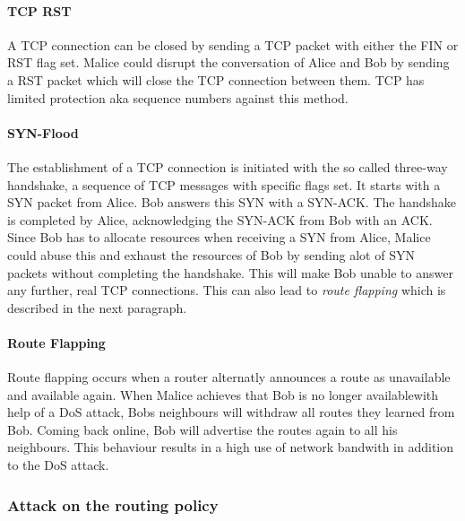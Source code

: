 \documentclass[12pt,a4paper]{IEEEtran}
\begin{document}
		\paragraph{TCP RST}
		A TCP connection can be closed by sending a TCP packet with either the FIN or RST flag set. 
		Malice could disrupt the conversation of Alice and Bob by sending a RST packet which will close the TCP connection between them. TCP has limited protection aka sequence numbers against this method. 

		\paragraph{SYN-Flood}
		The establishment of a TCP connection is initiated with the so called three-way handshake, a sequence of TCP messages with specific flags set. It starts with a SYN packet from Alice. Bob answers this SYN with a SYN-ACK. The handshake is completed by Alice, acknowledging the SYN-ACK from Bob with an ACK.
		Since Bob has to allocate resources when receiving a SYN from Alice, Malice could abuse this and exhaust the resources of Bob by sending alot of SYN packets without completing the handshake. This will make Bob unable to answer any further, real TCP connections. This can also lead to \emph{route flapping} which is described in the next paragraph.
		\paragraph{Route Flapping}
		Route flapping occurs when a router alternatly announces a route as unavailable and available again. When Malice achieves that Bob is no longer availablewith help of a DoS attack, Bobs neighbours will withdraw all routes they learned from Bob. Coming back online, Bob will advertise the routes again to all his neighbours.
		This behaviour results in a high use of network bandwith in addition to the DoS attack. 

		\subsubsection{Attack on the routing policy} 
		
\end{document}
